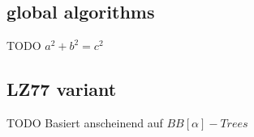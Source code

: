 \documentclass[xcolor=dvipsnames]{beamer}
\begin{document}


\subsection{global algorithms}
\begin{frame}{\FrameName}
	\begin{block}{TODO}
	\Gap
	$a^2 + b^2 = c^2$
\end{block}
\end{frame}

\subsection{LZ77 variant}
\begin{frame}{\FrameName}
	\begin{block}{TODO}
	\Gap
	Basiert anscheinend auf $BB[\alpha]-Trees$
\end{block}
\end{frame}
\end{document}
